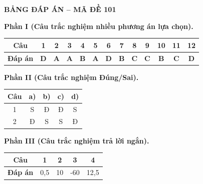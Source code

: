 \vspace{0.4cm}
\noindent\begin{minipage}{\linewidth}
\begin{center}{\large\bfseries\color{red!80!black} BẢNG ĐÁP ÁN -- MÃ ĐỀ 101}\end{center}
\vspace{0.15cm}
\noindent\textbf{Phần I (Câu trắc nghiệm nhiều phương án lựa chọn).}\par\smallskip
\begin{center}
\begin{tabular}{|c|c|c|c|c|c|c|c|c|c|c|c|c|}\hline
\textbf{Câu} & 1 & 2 & 3 & 4 & 5 & 6 & 7 & 8 & 9 & 10 & 11 & 12 \\ \hline
\textbf{Đáp án} & \textbf{D} & \textbf{A} & \textbf{A} & \textbf{B} & \textbf{A} & \textbf{D} & \textbf{B} & \textbf{C} & \textbf{C} & \textbf{B} & \textbf{C} & \textbf{D} \\ \hline
\end{tabular}
\end{center}
\noindent\textbf{Phần II (Câu trắc nghiệm Đúng/Sai).}\par\smallskip
\begin{center}
\begin{tabular}{|c|c|c|c|c|}\hline
\textbf{Câu} & \textbf{a)} & \textbf{b)} & \textbf{c)} & \textbf{d)} \\ \hline
1 & S & Đ & Đ & S \\ \hline
2 & Đ & S & S & Đ \\ \hline
\end{tabular}
\end{center}
\noindent\textbf{Phần III (Câu trắc nghiệm trả lời ngắn).}\par\smallskip
\begin{center}
\begin{tabular}{|c|c|c|c|c|}\hline
\textbf{Câu} & 1 & 2 & 3 & 4 \\ \hline
\textbf{Đáp án} & 0,5 & 10 & -60 & 12,5 \\ \hline
\end{tabular}
\end{center}
\end{minipage}
